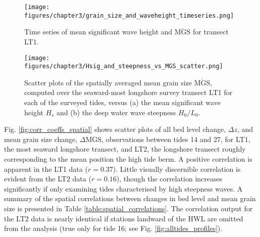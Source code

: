 \begin{figure}[tbp] %
	\begin{center}
	\texttt{[image: figures/chapter3/grain\_size\_and\_waveheight\_timeseries.png]}
	\caption[Time series of mean significant wave height and mean surficial grian size]{Time series of mean significant wave height and $\overline{\mathrm{MGS}}$ for transect LT1.\label{fig:hsig_mgs}}
	\end{center}
\end{figure}

\begin{figure}[tbp] %
	\begin{center}
		\texttt{[image: figures/chapter3/Hsig\_and\_steepness\_vs\_MGS\_scatter.png]}
		\caption[Mean surfical grain size versus significant wave height, wave steepness]{Scatter plots of the spatially averaged mean grain size $\overline{\mathrm{MGS}}$, computed over the seaward-most longshore survey transect LT1 for each of the surveyed tides, versus (a) the mean significant wave height $H_s$ and (b) the deep water wave steepness $H_0/L_0$. \label{fig:hsig_steepness_mgs_scatter}}
	\end{center}
\end{figure}

Fig. \ref{fig:corr_coeffs_spatial} shows scatter plots of all bed level change, $\Delta z$, and mean grain size change, $\Delta$MGS, observations between tides 14 and 27, for LT1, the most seaward longshore transect, and LT2, the longshore transect roughly corresponding to the mean position the high tide berm. A positive correlation is apparent in the LT1 data ($r=0.37$). Little visually discernible correlation is evident from the LT2 data ($r=0.16$), though the correlation increases significantly if only examining tides characterised by high steepness waves. A summary of the spatial correlations between changes in bed level and mean grain size is presented in Table \ref{table:spatial_correlations}. The correlation output for the LT2 data is nearly identical if stations landward of the HWL are omitted from the analysis (true only for tide 16; see Fig. \ref{fig:alltides_profiles}).

